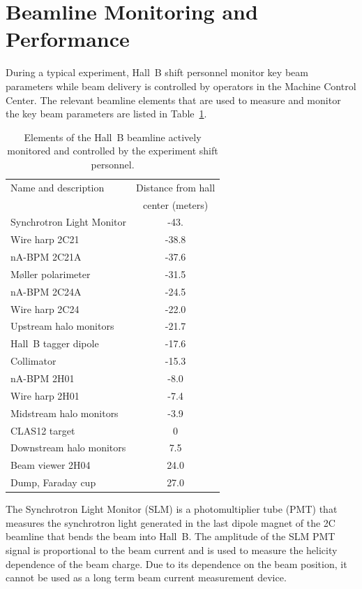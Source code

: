 \section{Beamline Monitoring and Performance}
\label{performance}

During a typical experiment, Hall~B shift personnel monitor key beam parameters while beam delivery is
controlled by operators in the Machine Control Center. The relevant beamline elements that are used to measure
and monitor the key beam parameters are listed in Table~\ref{tab:elements}. 

\begin{table}[htp]
\caption{Elements of the Hall~B beamline actively monitored and controlled by the experiment shift personnel.}
\begin{center}
  \begin{small}
\begin{tabular}{|l|c|}\hline
Name and description & Distance from hall \\
&center (meters) \\  \hline
Synchrotron Light Monitor& -43. \\ 
Wire harp 2C21 & -38.8 \\
nA-BPM 2C21A & -37.6  \\
M{\o}ller polarimeter & -31.5  \\
nA-BPM 2C24A & -24.5  \\
Wire harp 2C24 & -22.0  \\
Upstream halo monitors&-21.7 \\
Hall~B tagger dipole & -17.6  \\ \hline
Collimator & -15.3 \\
nA-BPM 2H01 & -8.0  \\ %
Wire harp 2H01 & -7.4 \\
Midstream halo monitors& -3.9 \\ 
CLAS12 target & 0  \\ \hline
Downstream halo monitors & 7.5 \\
Beam viewer 2H04 & 24.0  \\
Dump, Faraday cup & 27.0  \\ \hline
\end{tabular}
\end{small}
\end{center}
\label{tab:elements}
\end{table}

The Synchrotron Light Monitor (SLM) is a photomultiplier tube (PMT) that measures the synchrotron light 
generated in the last dipole magnet of the 2C beamline that bends the beam into Hall~B.  The amplitude of the SLM
PMT signal is proportional to the beam current and is used to measure the helicity dependence of the beam charge.
Due to its dependence on the beam position, it cannot be used as a long term beam current measurement device.

